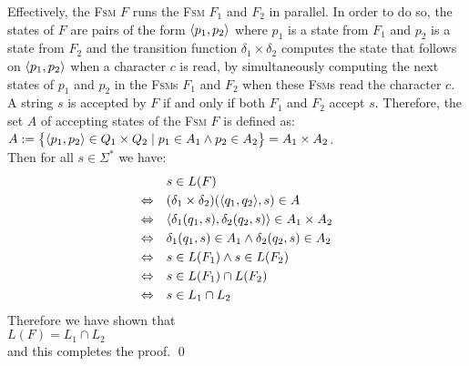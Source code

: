 Effectively, the \textsc{Fsm} $F$ runs the \textsc{Fsm} $F_1$ and $F_2$ in parallel.  In order to do so, the
states of $F$ are pairs of the form $\pair(p_1,p_2)$ where $p_1$ is a state from $F_1$ and $p_2$ is a state from
$F_2$ and the transition function $\delta_1 \times \delta_2$ computes the state that follows on
$\pair(p_1,p_2)$ when a character $c$ is read, by simultaneously computing the next states of $p_1$ and $p_2$
in the \textsc{Fsm}s $F_1$ and $F_2$ when these \textsc{Fsm}s read the character $c$. 
A string $s$ is accepted by $F$ if and only if
both $F_1$ and  $F_2$ accept $s$.  Therefore, the set $A$ of accepting states of the \textsc{Fsm} $F$ is defined as:
\\[0.2cm]
\hspace*{1.3cm}
$A := \bigl\{ \pair(p_1,p_2) \in Q_1 \times Q_2 \mid p_1 \in A_1 \wedge p_2 \in A_2 \bigr\} = A_1 \times A_2$.
\\[0.2cm]
Then for all $s \in \Sigma^*$ we have:
$$
\begin{array}[t]{cl}
                & s \in L(F)                                                           \\[0.1cm]
\Leftrightarrow & (\delta_1 \times \delta_2)(\pair(q_1,q_2), s) \in A                                      \\[0.1cm]
\Leftrightarrow & \langle \delta_1(q_1,s), \delta_2(q_2, s) \rangle \in A_1 \times A_2 \\[0.1cm]
\Leftrightarrow & \delta_1(q_1,s) \in A_1 \wedge  \delta_2(q_2, s) \in A_2             \\[0.1cm]
\Leftrightarrow & s \in L(F_1) \wedge  s \in L(F_2)                                    \\[0.1cm]
\Leftrightarrow & s \in L(F_1) \cap L(F_2)                                             \\[0.1cm]
\Leftrightarrow & s \in L_1 \cap L_2                                                 
\end{array}
$$
Therefore we have shown that
\\[0.2cm]
\hspace*{1.3cm}
 $L(F) = L_1 \cap L_2$ 
\\[0.2cm]
and this completes the proof. \qed

